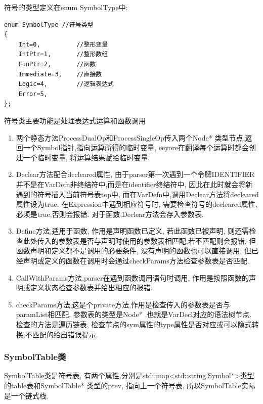 \documentclass[UTF8]{article}
\begin{document}
符号的类型定义在enum SymbolType中:
\begin{lstlisting}
enum SymbolType //符号类型
{
    Int=0,          //整形变量
    IntPtr=1,       //整形数组
    FunPtr=2,       //函数
    Immediate=3,    //直接数
    Logic=4,        //逻辑表达式
    Error=5,        
};
\end{lstlisting}
符号类主要功能是处理表达式运算和函数调用
\begin{enumerate}[(1)]
\item 两个静态方法ProcessDualOp和ProcessSingleOp传入两个Node* 类型节点,返回一个Symbol指针,指向运算所得的临时变量, eeyore在翻译每个运算时都会创建一个临时变量, 将运算结果赋给临时变量.
\item Declear方法配合decleared属性, 由于parser第一次遇到一个令牌IDENTIFIER并不是在VarDefn非终结符中,而是在identifier终结符中, 因此在此时就会将新遇到的符号插入当前符号表top中, 而在VarDefn中,调用Declear方法将decleared属性设为true. 在Expression中遇到相应符号时, 需要检查符号的decleared属性,必须是true,否则会报错. 对于函数,Declear方法会存入参数表.
\item Define方法,适用于函数, 作用是声明函数已定义, 若此函数已被声明, 则还需检查此处传入的参数表是否与声明时使用的参数表相匹配,若不匹配则会报错. 但函数声明和定义都不是调用的必要条件, 没有声明的函数也可以直接调用, 但已经声明或定义的函数在调用时会通过checkParams方法检查参数表是否匹配.
\item CallWithParams方法,parser在遇到函数调用语句时调用, 作用是按照函数的声明或定义状态检查参数表并给出相应的报错.
\item checkParams方法,这是个private方法,作用是检查传入的参数表是否与paramList相匹配. 参数表的类型是Node* ,也就是VarDecl对应的语法树节点. 检查的方法是遍历链表, 检查节点的sym属性的type属性是否对应或可以隐式转换,不匹配的给出错误提示.
\end{enumerate}

\subsubsection{SymbolTable类}
SymbolTable类是符号表, 有两个属性,分别是std::map<std::string,Symbol*>类型的table表和SymbolTable* 类型的prev, 指向上一个符号表, 所以SymbolTable实际是一个链式栈.
\end{document}
